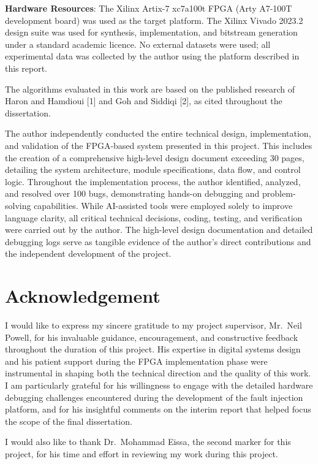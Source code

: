 \documentclass[
  english,
  12pt,
]{report}
\begin{document}
\textbf{Hardware Resources}: The Xilinx Artix-7 xc7a100t FPGA (Arty
A7-100T development board) was used as the target platform. The Xilinx
Vivado 2023.2 design suite was used for synthesis, implementation, and
bitstream generation under a standard academic licence. No external
datasets were used; all experimental data was collected by the author
using the platform described in this report.

The algorithms evaluated in this work are based on the published
research of Haron and Hamdioui {[}1{]} and Goh and Siddiqi {[}2{]}, as
cited throughout the dissertation.

The author independently conducted the entire technical design,
implementation, and validation of the FPGA-based system presented in
this project. This includes the creation of a comprehensive high-level
design document exceeding 30 pages, detailing the system architecture,
module specifications, data flow, and control logic. Throughout the
implementation process, the author identified, analyzed, and resolved
over 100 bugs, demonstrating hands-on debugging and problem-solving
capabilities. While AI-assisted tools were employed solely to improve
language clarity, all critical technical decisions, coding, testing, and
verification were carried out by the author. The high-level design
documentation and detailed debugging logs serve as tangible evidence of
the author's direct contributions and the independent development of the
project.

\chapter{Acknowledgement}\label{acknowledgement}

I would like to express my sincere gratitude to my project supervisor,
Mr.~Neil Powell, for his invaluable guidance, encouragement, and
constructive feedback throughout the duration of this project. His
expertise in digital systems design and his patient support during the
FPGA implementation phase were instrumental in shaping both the
technical direction and the quality of this work. I am particularly
grateful for his willingness to engage with the detailed hardware
debugging challenges encountered during the development of the fault
injection platform, and for his insightful comments on the interim
report that helped focus the scope of the final dissertation.

I would also like to thank Dr.~Mohammad Eissa, the second marker for
this project, for his time and effort in reviewing my work during this
project.
\end{document}
